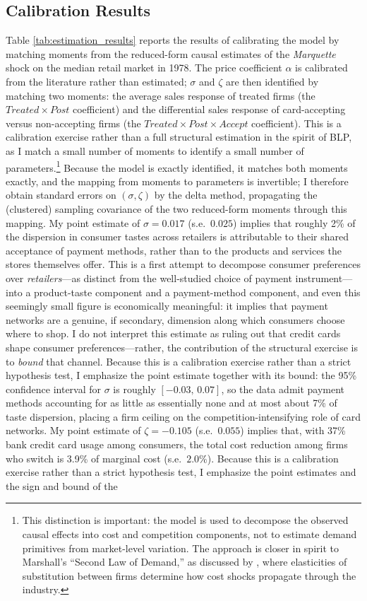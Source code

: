 \documentclass[12pt,english]{article}
\begin{document}
\subsection{Calibration Results}

Table \ref{tab:estimation_results} reports the results of calibrating the model by matching moments from the reduced-form causal estimates of the \emph{Marquette} shock on the median retail market in 1978. The price coefficient $\alpha$ is calibrated from the literature rather than estimated; $\sigma$ and $\zeta$ are then identified by matching two moments: the average sales response of treated firms (the $Treated\times Post$ coefficient) and the differential sales response of card-accepting versus non-accepting firms (the $Treated\times Post\times Accept$ coefficient). This is a calibration exercise rather than a full structural estimation in the spirit of BLP, as I match a small number of moments to identify a small number of parameters.\footnote{This distinction is important: the model is used to decompose the observed causal effects into cost and competition components, not to estimate demand primitives from market-level variation. The approach is closer in spirit to Marshall's ``Second Law of Demand,'' as discussed by \cite{melitz_impact_2003}, where elasticities of substitution between firms determine how cost shocks propagate through the industry.} Because the model is exactly identified, it matches both moments exactly, and the mapping from moments to parameters is invertible; I therefore obtain standard errors on $(\sigma,\zeta)$ by the delta method, propagating the (clustered) sampling covariance of the two reduced-form moments through this mapping. My point estimate of $\sigma = 0.017$ (s.e.\ $0.025$) implies that roughly 2\% of the dispersion in consumer tastes across retailers is attributable to their shared acceptance of payment methods, rather than to the products and services the stores themselves offer. This is a first attempt to decompose consumer preferences over \emph{retailers}---as distinct from the well-studied choice of payment instrument---into a product-taste component and a payment-method component, and even this seemingly small figure is economically meaningful: it implies that payment networks are a genuine, if secondary, dimension along which consumers choose where to shop. I do not interpret this estimate as ruling out that credit cards shape consumer preferences---rather, the contribution of the structural exercise is to \emph{bound} that channel. Because this is a calibration exercise rather than a strict hypothesis test, I emphasize the point estimate together with its bound: the 95\% confidence interval for $\sigma$ is roughly $[-0.03,\,0.07]$, so the data admit payment methods accounting for as little as essentially none and at most about 7\% of taste dispersion, placing a firm ceiling on the competition-intensifying role of card networks. My point estimate of $\zeta = -0.105$ (s.e.\ $0.055$) implies that, with 37\% bank credit card usage among consumers, the total cost reduction among firms who switch is 3.9\% of marginal cost (s.e.\ $2.0\%$). Because this is a calibration exercise rather than a strict hypothesis test, I emphasize the point estimates and the sign and bound of the 
\end{document}
